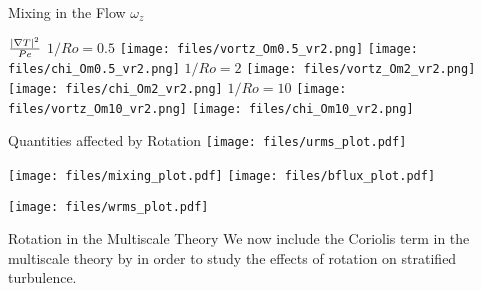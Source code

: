\documentclass{beamer}
\begin{document}
\begin{frame}{Mixing in the Flow}
        $\omega_z$
        
        \vspace{75pt}
        
        $\frac{|\nabla T|^2}{Pe}$
    \emp
        \centering
        $1/Ro = 0.5$
        \texttt{[image: files/vortz\_Om0.5\_vr2.png]}
        \texttt{[image: files/chi\_Om0.5\_vr2.png]}
    \emp
        \centering
        $1/Ro = 2$
        \texttt{[image: files/vortz\_Om2\_vr2.png]}
        \texttt{[image: files/chi\_Om2\_vr2.png]}
    \emp
        \centering
        $1/Ro = 10$
        \texttt{[image: files/vortz\_Om10\_vr2.png]}
        \texttt{[image: files/chi\_Om10\_vr2.png]}
    \emp
\end{frame}

\begin{frame}{Quantities affected by Rotation}
        \centering
        \texttt{[image: files/urms\_plot.pdf]}
    
        \texttt{[image: files/mixing\_plot.pdf]}
    \emp
    \hspace{2pt} 
        \centering
        \texttt{[image: files/bflux\_plot.pdf]}

        \texttt{[image: files/wrms\_plot.pdf]}
    \emp
\end{frame}



\begin{frame}{Rotation in the Multiscale Theory}
    We now include the Coriolis term in the multiscale theory by \citet{Chinial2022} in order to study the effects of rotation on stratified turbulence.
\end{frame}
\end{document}
